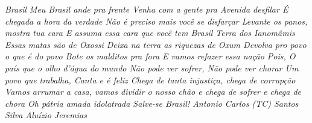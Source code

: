 \begin{epigrafe}
    \vspace*{\fill}
	\begin{flushright}\textit{ Brasil Meu Brasil ande pra frente Venha com a gente pra Avenida desfilar \'E chegada a hora da verdade N\~ao \'e preciso mais voc\^e se disfar\c{c}ar Levante os panos, mostra tua cara E assuma essa cara que voc\^e tem Brasil Terra dos Ianom\^amis Essas matas s\~ao de Oxossi Deixa na terra as riquezas de Oxum Devolva pro povo o que \'e do povo Bote os malditos pra fora E vamos refazer essa na\c{c}\~ao Pois, O pa\'{i}s que o olho d’\'agua do mundo N\~ao pode ver sofrer, N\~ao pode ver chorar Um povo que trabalha, Canta e \'e feliz Chega de tanta injusti\c{c}a, chega de corrup\c{c}\~ao Vamos arrumar a casa, vamos dividir o nosso ch\~ao e chega de sofrer e chega de chora Oh p\'atria amada idolatrada Salve-se Brasil! Antonio Carlos (TC) Santos Silva Alu\'{i}zio Jeremias}
	\end{flushright}
\end{epigrafe}
